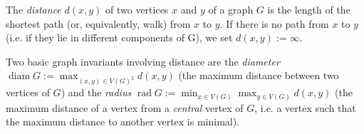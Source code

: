 \documentclass[12pt]{article}
\DeclareMathOperator{\diam}{diam}
\DeclareMathOperator{\rad}{rad}
\begin{document}
The \emph{distance} $d(x,y)$ of two vertices $x$ and $y$ of a graph $G$ is the length of the shortest path (or, equivalently, walk) from $x$ to $y$. If there is no path from $x$ to $y$ (i.e. if they lie in different components of G), we set $d(x,y) := \infty.$ 

Two basic graph invariants involving distance are the \emph{diameter} $\diam G := \max_{(x,y)\in V(G)^2} d(x,y)$ (the maximum distance between two vertices of $G$) and the \emph{radius} $\rad G := \min_{x\in V(G)} \max_{y\in V(G)} d(x,y)$ (the maximum distance of a vertex from a \emph{central} vertex of $G$, i.e. a vertex such that the maximum distance to another vertex is minimal).
\end{document}
